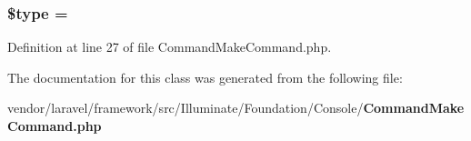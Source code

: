 \subsubsection[{\$type}]{\setlength{\rightskip}{0pt plus 5cm}\$type = \textquotesingle{}\hspace{0.3cm}{\ttfamily [protected]}}\label{class_illuminate_1_1_foundation_1_1_console_1_1_command_make_command_a9a4a6fba2208984cabb3afacadf33919}


Definition at line 27 of file Command\+Make\+Command.\+php.



The documentation for this class was generated from the following file\+:\begin{DoxyCompactItemize}
\item 
vendor/laravel/framework/src/\+Illuminate/\+Foundation/\+Console/{\bf Command\+Make\+Command.\+php}\end{DoxyCompactItemize}
